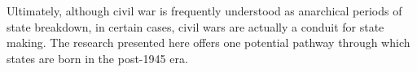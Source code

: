 \documentclass[12pt, letterpaper]{article}
\begin{document}
Ultimately, although civil war is frequently understood as anarchical periods of state breakdown, in certain cases, civil wars are actually a conduit for state making. The research presented here offers one potential pathway through which states are born in the post-1945 era. %





\newpage
\clearpage
\thispagestyle{plain}
\singlespace




\newpage
\clearpage
\thispagestyle{plain}
\setcounter{page}{1}
\setcounter{footnote}{0}
\doublespace
\end{document}

